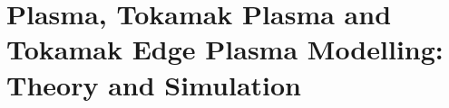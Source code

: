 \section{Plasma, Tokamak Plasma and Tokamak Edge Plasma Modelling: Theory and Simulation}


    
    
    
